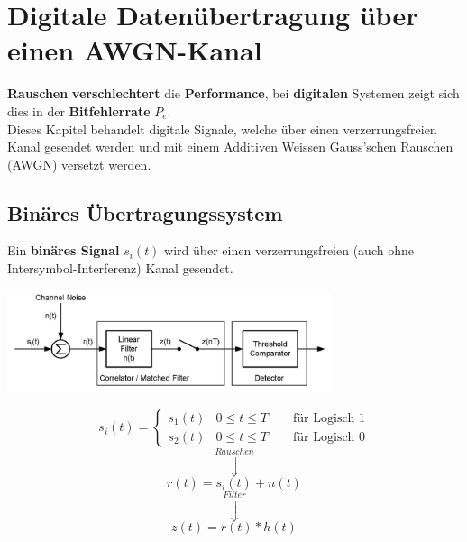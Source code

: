 \section{Digitale Datenübertragung über einen AWGN-Kanal }
\textbf{Rauschen} \textbf{verschlechtert} die \textbf{Performance}, bei \textbf{digitalen} Systemen zeigt sich dies in der
\textbf{Bitfehlerrate} $P_e$. \\
Dieses Kapitel behandelt digitale Signale, welche über einen verzerrungsfreien Kanal gesendet werden
und mit einem Additiven Weissen Gauss'schen Rauschen (AWGN) versetzt werden. 

\subsection{Binäres Übertragungssystem }
Ein \textbf{binäres Signal} $s_i(t)$  wird
über einen verzerrungsfreien (auch ohne Intersymbol-Interferenz) Kanal gesendet. \\
\begin{minipage}{10cm}
 	\includegraphics[width=9.5cm]{bilder/09_digital_signal_detection.png}
\end{minipage}
\begin{minipage}[c]{9cm}
	$$s_i(t) = \begin{cases}
          	s_1(t) & 0 \leq t \leq T \qquad \text{für Logisch } 1 \\
          	s_2(t) & 0 \leq t \leq T \qquad \text{für Logisch } 0          	
          \end{cases} $$
	$$\overset{Rauschen}{\Downarrow}$$
	$$	r(t) = s_i(t) + n(t) $$
	$$	\overset{Filter}{\Downarrow} $$ 
	$$	z(t) = r(t) \ast h(t) $$
\end{minipage}

